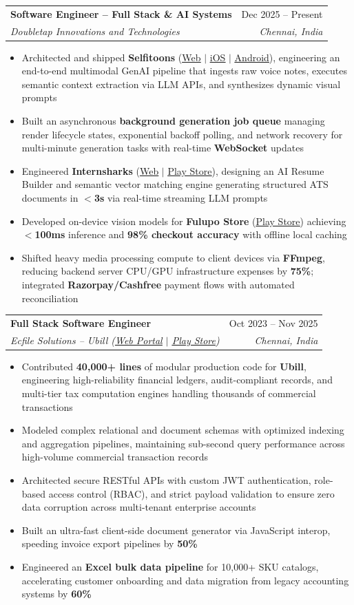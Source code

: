 \documentclass[letterpaper,10pt]{article}
\makeatletter
\newcommand{\resumeItem}[1]{
  \item\small{
    {#1 \vspace{-2pt}}
  }
}
\newcommand{\resumeSubheading}[4]{
  \vspace{-2pt}\item
    \begin{tabular*}{0.97\textwidth}[t]{l@{\extracolsep{\fill}}r}
      \textbf{#1} & #2 \\
      \textit{\small#3} & \textit{\small #4} \\
    \end{tabular*}\vspace{-6pt}
}
\newcommand{\resumeItemListStart}{\begin{itemize}}
\newcommand{\resumeItemListEnd}{\end{itemize}\vspace{-5pt}}
\makeatother
\begin{document}
    \resumeSubheading
      {Software Engineer -- Full Stack \& AI Systems}{Dec 2025 -- Present}
      {Doubletap Innovations and Technologies}{Chennai, India}
      \resumeItemListStart
        \resumeItem{Architected and shipped \textbf{Selfitoons} (\href{https://selfitoons.ai/}{\underline{Web}} $|$ \href{https://apps.apple.com/in/app/selfitoons/id6758597947}{\underline{iOS}} $|$ \href{https://play.google.com/store/apps/details?id=com.doubletap.ai.selfitoons}{\underline{Android}}), engineering an end-to-end multimodal GenAI pipeline that ingests raw voice notes, executes semantic context extraction via LLM APIs, and synthesizes dynamic visual prompts}
        \resumeItem{Built an asynchronous \textbf{background generation job queue} managing render lifecycle states, exponential backoff polling, and network recovery for multi-minute generation tasks with real-time \textbf{WebSocket} updates}
        \resumeItem{Engineered \textbf{Internsharks} (\href{https://internsharks.ai/}{\underline{Web}} $|$ \href{https://play.google.com/store/apps/details?id=com.doubletap.internsharks.ai}{\underline{Play Store}}), designing an AI Resume Builder and semantic vector matching engine generating structured ATS documents in \textbf{$<$3s} via real-time streaming LLM prompts}
        \resumeItem{Developed on-device vision models for \textbf{Fulupo Store} (\href{https://play.google.com/store/apps/details?id=com.doubletap.fulupostore}{\underline{Play Store}}) achieving \textbf{$<$100ms} inference and \textbf{98\% checkout accuracy} with offline local caching}
        \resumeItem{Shifted heavy media processing compute to client devices via \textbf{FFmpeg}, reducing backend server CPU/GPU infrastructure expenses by \textbf{75\%}; integrated \textbf{Razorpay/Cashfree} payment flows with automated reconciliation}
      \resumeItemListEnd

    \resumeSubheading
      {Full Stack Software Engineer}{Oct 2023 -- Nov 2025}
      {Ecfile Solutions -- Ubill (\href{https://app.ubill.tech/}{\underline{Web Portal}} $|$ \href{https://play.google.com/store/apps/details?id=com.ubill.tech}{\underline{Play Store}})}{Chennai, India}
      \resumeItemListStart
        \resumeItem{Contributed \textbf{40,000+ lines} of modular production code for \textbf{Ubill}, engineering high-reliability financial ledgers, audit-compliant records, and multi-tier tax computation engines handling thousands of commercial transactions}
        \resumeItem{Modeled complex relational and document schemas with optimized indexing and aggregation pipelines, maintaining sub-second query performance across high-volume commercial transaction records}
        \resumeItem{Architected secure RESTful APIs with custom JWT authentication, role-based access control (RBAC), and strict payload validation to ensure zero data corruption across multi-tenant enterprise accounts}
        \resumeItem{Built an ultra-fast client-side document generator via JavaScript interop, speeding invoice export pipelines by \textbf{50\%}}
        \resumeItem{Engineered an \textbf{Excel bulk data pipeline} for 10,000+ SKU catalogs, accelerating customer onboarding and data migration from legacy accounting systems by \textbf{60\%}}
      \resumeItemListEnd
\end{document}
